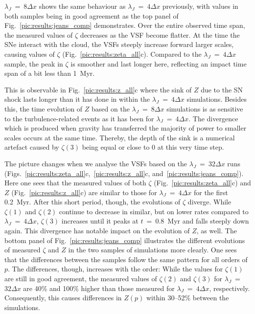 $\lambda_J$~=~$8\Delta{}x$ shows the same behaviour as $\lambda_J$~=~$4\Delta{}x$ previously, with values in both samples being in good agreement as the top panel of Fig.~\ref{pic:results:jeans_comp} demonstrates. 
Over the entire observed time span, the measured values of $\zeta$ decreases as the VSF become flatter.
At the time the SNe interact with the cloud, the VSFs steeply increase forward larger scales, causing values of $\zeta$ (Fig.~\ref{pic:results:zeta_all}c).
Compared to the $\lambda_J$~=~$4\Delta{}x$ sample, the peak in $\zeta$ is smoother and last longer here, reflecting an impact time span of a bit less than 1~Myr.

This is observable in Fig.~\ref{pic:results:z_all}c where the sink of $Z$ due to the SN shock lasts longer than it has done in within the $\lambda_J$~=~$4\Delta{}x$ simulations. 
Besides this, the time evolution of $Z$ based on the $\lambda_J$~=~$8\Delta{}x$ simulations is as sensitive to the turbulence-related events as it has been for $\lambda_J$~=~$4\Delta{}x$.
The divergence which is produced when gravity has transferred the majority of power to smaller scales occurs at the same time. 
Thereby, the depth of the sink is a numerical artefact caused by $\zeta(3)$ being equal or close to 0 at this very time step. 

The picture changes when we analyse the VSFs based on the $\lambda_J$~=~$32\Delta{}x$ runs (Figs.~\ref{pic:results:zeta_all}c,~\ref{pic:results:z_all}c, and~\ref{pic:results:jeans_comp}).
Here one sees that the measured values of both $\zeta$ (Fig.~\ref{pic:results:zeta_all}c) and $Z$ (Fig.~\ref{pic:results:z_all}c) are similar to those for $\lambda_J$~=~$4\Delta{}x$ for the first 0.2~Myr.
After this short period, though, the evolutions of $\zeta$ diverge. 
While $\zeta(1)$ and $\zeta(2)$ continue to decrease in similar, but on lower rates compared to $\lambda_J$~=~$4\Delta{}x$, $\zeta(3)$ increases until it peaks at $t$~=~0.8~Myr and falls steeply down again.
This divergence has notable impact on the evolution of $Z$, as well. 
The bottom panel of Fig.~\ref{pic:results:jeans_comp} illustrates the different evolutions of measured $\zeta$ and $Z$ in the two samples of simulations more clearly.
One sees that the differences between the samples follow the same pattern for all orders of $p$.
The differences, though, increases with the order:
While the values for $\zeta(1)$ are still in good agreement, the measured values of $\zeta(2)$ and $\zeta(3)$ for $\lambda_J$~=~$32\Delta{}x$ are 40\% and 100\% higher than those measured for $\lambda_J$~=~$4\Delta{}x$, respectively.
Consequently, this causes differences in $Z(p)$ within 30--52\% between the simulations.

